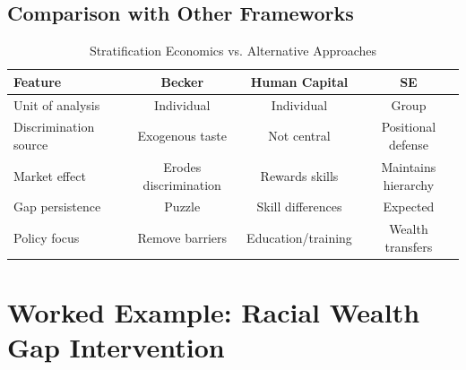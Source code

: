 \subsection{Comparison with Other Frameworks}

\begin{table}[htbp]
\centering
\caption{Stratification Economics vs. Alternative Approaches}
\label{tab:se-comparison}
\begin{tabular}{lccc}
\toprule
\textbf{Feature} & \textbf{Becker} & \textbf{Human Capital} & \textbf{SE} \\
\midrule
Unit of analysis & Individual & Individual & Group \\
Discrimination source & Exogenous taste & Not central & Positional defense \\
Market effect & Erodes discrimination & Rewards skills & Maintains hierarchy \\
Gap persistence & Puzzle & Skill differences & Expected \\
Policy focus & Remove barriers & Education/training & Wealth transfers \\
\bottomrule
\end{tabular}
\end{table}

\section{Worked Example: Racial Wealth Gap Intervention}
\label{sec:se-example}

